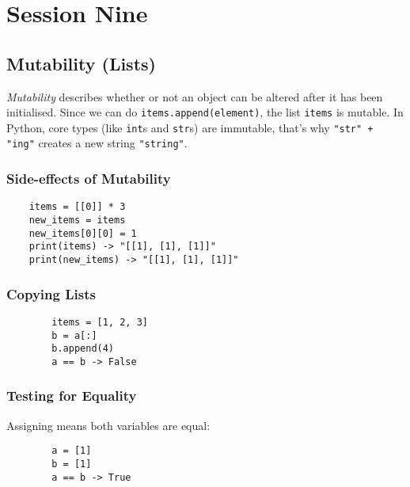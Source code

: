 \section{Session Nine}\label{sec:session_nine}

\subsection{Mutability (Lists)}\label{sub:mutability}

\emph{Mutability} describes whether or not an object can be altered after it has been initialised.
Since we can do \texttt{items.append(element)}, the list \texttt{items} is mutable.
In Python, core types (like \texttt{int}s and \texttt{str}s) are immutable, that's why \texttt{"str" + "ing"} creates a new string \texttt{"string"}.

\subsubsection{Side-effects of Mutability}\label{ssub:side_effects_of_mutability}

\begin{verbatim}
    items = [[0]] * 3
    new_items = items
    new_items[0][0] = 1
    print(items) -> "[[1], [1], [1]]"
    print(new_items) -> "[[1], [1], [1]]"
\end{verbatim}

\subsubsection{Copying Lists}\label{ssub:copying_lists}

\begin{center}
    \begin{verbatim}
        items = [1, 2, 3]
        b = a[:]
        b.append(4)
        a == b -> False   
    \end{verbatim}
\end{center}

\subsubsection{Testing for Equality}\label{ssub:testing_for_equality}

\noindent
Assigning means both variables are equal:

\begin{center}
    \begin{verbatim}
        a = [1]
        b = [1]
        a == b -> True
    \end{verbatim}
\end{center}

